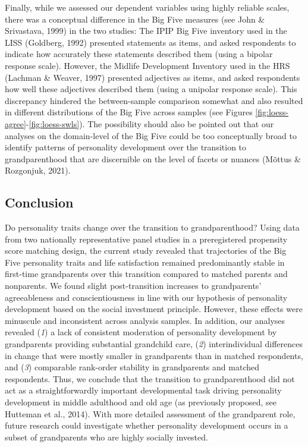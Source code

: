 \documentclass[
  english,
  man, noextraspace,floatsintext]{apa7}
\begin{document}
Finally, while we assessed our dependent variables using highly reliable scales, there was a conceptual difference in the Big Five measures (see John \& Srivastava, 1999) in the two studies: The IPIP Big Five inventory used in the LISS (Goldberg, 1992) presented statements as items, and asked respondents to indicate how accurately these statements described them (using a bipolar response scale). However, the Midlife Development Inventory used in the HRS (Lachman \& Weaver, 1997) presented adjectives as items, and asked respondents how well these adjectives described them (using a unipolar response scale). This discrepancy hindered the between-sample comparison somewhat and also resulted in different distributions of the Big Five across samples (see Figures \ref{fig:loess-agree}-\ref{fig:loess-swls}). The possibility should also be pointed out that our analyses on the domain-level of the Big Five could be too conceptually broad to identify patterns of personality development over the transition to grandparenthood that are discernible on the level of facets or nuances (Mõttus \& Rozgonjuk, 2021).

\hypertarget{conclusion}{%
\subsection{Conclusion}\label{conclusion}}

Do personality traits change over the transition to grandparenthood? Using data from two nationally representative panel studies in a preregistered propensity score matching design, the current study revealed that trajectories of the Big Five personality traits and life satisfaction remained predominantly stable in first-time grandparents over this transition compared to matched parents and nonparents. We found slight post-transition increases to grandparents' agreeableness and conscientiousness in line with our hypothesis of personality development based on the social investment principle. However, these effects were minuscule and inconsistent across analysis samples. In addition, our analyses revealed (\emph{1}) a lack of consistent moderation of personality development by grandparents providing substantial grandchild care, (\emph{2}) interindividual differences in change that were mostly smaller in grandparents than in matched respondents, and (\emph{3}) comparable rank-order stability in grandparents and matched respondents. Thus, we conclude that the transition to grandparenthood did not act as a straightforwardly important developmental task driving personality development in middle adulthood and old age (as previously proposed, see Hutteman et al., 2014). With more detailed assessment of the grandparent role, future research could investigate whether personality development occurs in a subset of grandparents who are highly socially invested.
\end{document}
